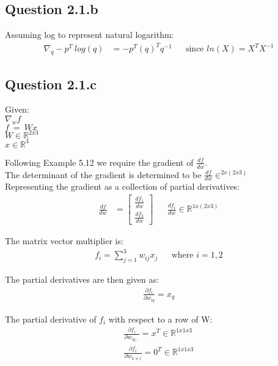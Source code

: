 \documentclass[a4paper]{article}
\begin{document}
\subsection*{Question 2.1.b}
Assuming log to represent natural logarithm:
\begin{align*}
    \nabla_q - p^T\ log(q) &= -p^T(q)^Tq^{-1} && \text{since\ }ln(X) = X^TX^{-1}
\end{align*}


\subsection*{Question 2.1.c}
Given:\\
$\nabla_{w}f$ \\
$f\ =\ Wx$ \\
$W \in \mathbb{R}^{2x3}$ \\
$x \in \mathbb{R}^3$

Following Example 5.12 we require the gradient of $\frac{df}{dw}$. \\
The determinant of the gradient is determined to be  $\frac{df}{dw} \in ^{2x(2x3)}$ \\
Representing the gradient as a collection of partial derivatives:\\
\begin{align*}
    \frac{df}{dw} &= \begin{bmatrix}
    \frac{df_1}{dw} \\
    \frac{df_2}{dw}
    \end{bmatrix} && \frac{df_i}{dw} \in \mathbb{R}^{1x(2x3)}
\end{align*}{}

The matrix vector multiplier is:\\
\begin{align*} 
    f_i = \sum_{j=1}^{3} w_{ij}x_{j} && \text{where\ } i = 1,2
\end{align*}{}

The partial derivatives are then given as: \\
\begin{align*}
    \frac{\partial f_i}{\partial w_{iq}} = x_q
\end{align*}{}

The partial derivative of $f_i$ with respect to a row of W:
\begin{align*}
    \frac{\partial f_i}{\partial w_{iq,:}} = x^T \in \mathbb{R}^{1x1x3} \\
    \frac{\partial f_i}{\partial w_{k \neq i}} = 0^T \in \mathbb{R}^{1x1x3} \\
\end{align*}{}
\end{document}
